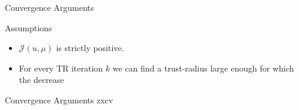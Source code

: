 \begin{frame}{Convergence Arguments}
    \begin{block}{Assumptions}
        \begin{itemize}
            \item $\mathcal{J}(u, \mu)$ is strictly positive.
            \item For every TR iteration $k$ we can find a trust-radius large enough for which the decrease
        \end{itemize}
    \end{block}


\end{frame}

\begin{frame}{Convergence Arguments}
    zxcv~\cite{Banholzer2020}
\end{frame}